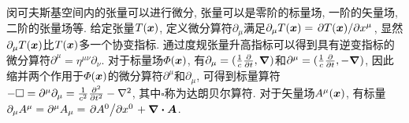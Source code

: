 \begin{proposition}[张量的微分与积分]\label{pro:张量的微分与积分}
    闵可夫斯基空间内的张量可以进行微分, 张量可以是零阶的标量场, 一阶的矢量场, 二阶的张量场等. 给定张量$ T(\vb*{x}) $, 定义微分算符$ \partial_{\mu} $满足$ \partial_{\mu} T(\vb*{x}) = \pdv*{T(\vb*{x})}{x^{\mu}} $, 显然$ \partial_{\mu} T(\vb*{x}) $比$ T(\vb*{x}) $多一个协变指标. 通过度规张量升高指标可以得到具有逆变指标的微分算符$ \partial^{\mu}=\eta^{\mu\nu}\partial_{\nu} $. 对于标量场$ \varPhi(\vb*{x}) $, 有$ \partial_{\mu}=(\frac{1}{c}\pdv{t},\grad) $和$ \partial^{\mu}=(\frac{1}{c}\pdv{t},-\grad) $, 因此缩并两个作用于$ \varPhi(\vb*{x}) $的微分算符$ \partial^{\mu} $和$ \partial_{\mu} $, 可得到标量算符$ -\square = \partial^{\mu} \partial_{\mu} = \frac{1}{c^2} \pdv[2]{t} - \laplacian $, 其中$ \square $称为达朗贝尔算符. 对于矢量场$ A^{\mu}(\vb*{x}) $, 有标量$ \partial_{\mu}A^{\mu}=\partial^{\mu}A_{\mu}=\pdv*{A^0}{x^0} + \div{\vb*{A}} $.


\end{proposition}
